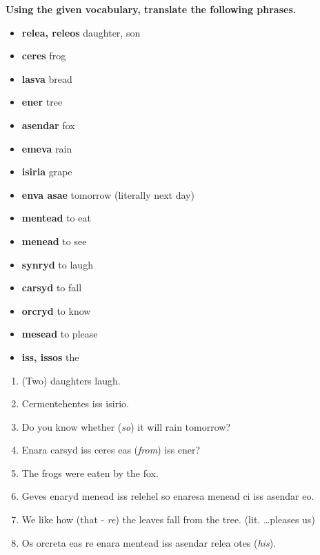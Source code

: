 \textbf{Using the given vocabulary, translate the following phrases.}

\begin{itemize}
  \item \textbf{relea, releos} daughter, son
  \item \textbf{ceres} frog
  \item \textbf{lasva} bread
  \item \textbf{ener} tree
  \item \textbf{asendar} fox
  \item \textbf{emeva} rain
  \item \textbf{isiria} grape
  \item \textbf{enva asae} tomorrow (literally next day)
  \item \textbf{mentead} to eat
  \item \textbf{menead} to see
  \item \textbf{synryd} to laugh
  \item \textbf{carsyd} to fall
  \item \textbf{orcryd} to know
  \item \textbf{mesead} to please
  \item \textbf{iss, issos} the
\end{itemize}
\begin{enumerate}
  \item (Two) daughters laugh.
  \item Cermentehentes iss isirio.
  \item Do you know whether (\emph{so}) it will rain tomorrow?
  \item Enara carsyd iss ceres eas (\emph{from}) iss ener?
  \item The frogs were eaten by the fox.
  \item Geves enaryd menead iss relehel so enaresa menead ci iss asendar eo.
  \item We like how (that - \emph{re}) the leaves fall from the tree. (lit. \ldots pleases us)
  \item Os orcreta eas re enara mentead iss asendar relea otes (\emph{his}).
\end{enumerate}
